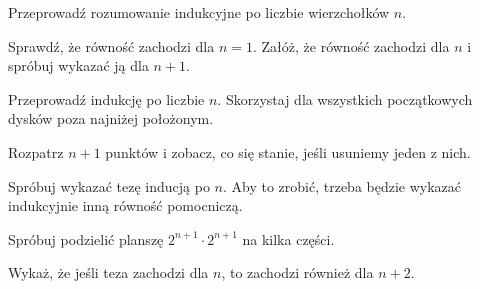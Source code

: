 \newpage
{}

\begin{hints_list}
	\item Przeprowadź rozumowanie indukcyjne po liczbie wierzchołków $n$.

	\item Sprawdź, że równość zachodzi dla $n = 1$. Załóż, że równość zachodzi dla $n$ i spróbuj wykazać ją dla $n + 1$.

	\item Przeprowadź indukcję po liczbie $n$. Skorzystaj dla wszystkich początkowych dysków poza najniżej położonym.

	\item Rozpatrz $n + 1$ punktów i zobacz, co się stanie, jeśli usuniemy jeden z nich.

	\item Spróbuj wykazać tezę inducją po $n$. Aby to zrobić, trzeba będzie wykazać indukcyjnie inną równość pomocniczą.

	\item Spróbuj podzielić planszę $2^{n + 1} \cdot 2^{n + 1}$ na kilka części.

	\item Wykaż, że jeśli teza zachodzi dla $n$, to zachodzi również dla $n + 2$.
\end{hints_list}
